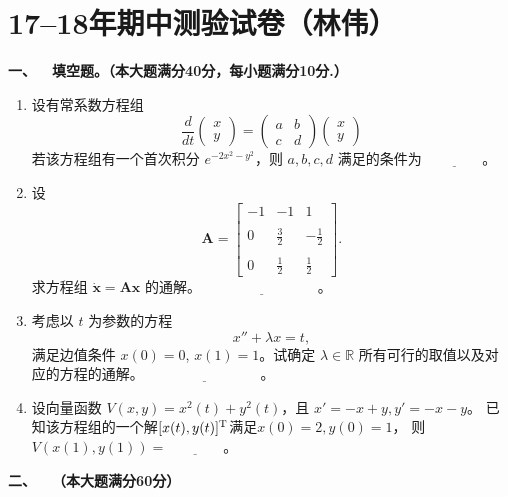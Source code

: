 \section{17--18年期中测验试卷（林伟）}

\textbf{一、\ \ 填空题。（本大题满分40分，每小题满分10分.）}
\begin{enumerate}
\item[1.] 设有常系数方程组 
\[
\frac{d}{dt}\begin{pmatrix} x \\ y \end{pmatrix} = 
\begin{pmatrix}
a & b \\
c & d
\end{pmatrix}
\begin{pmatrix} x \\ y \end{pmatrix}
\]
若该方程组有一个首次积分 $e^{-2x^2-y^2}$，则 $a,b,c,d$ 满足的条件为
$\underline{\qquad\qquad}$。

\item[2.]
设 
\[
\boldsymbol{A} = \begin{bmatrix} 
-1 & -1 & 1 \\ \\
0 & \frac{3}{2} & -\frac{1}{2} \\ \\
0 & \frac{1}{2} & \frac{1}{2} 
\end{bmatrix}.
\]
求方程组 $\dot{\boldsymbol{x}} = \boldsymbol{Ax}$ 的通解。
$\underline{\qquad\qquad\qquad\qquad}$。


\item[3.]
考虑以 $t$ 为参数的方程 
\[
x'' + \lambda x = t,
\]
满足边值条件 $x(0) = 0$, $x(1) = 1$。试确定 $\lambda \in \mathbb{R}$ 所有可行的取值以及对应的方程的通解。
$\underline{\qquad\qquad\qquad\qquad}$。


\item[4.]
设向量函数 $V(x,y) = x^2(t) + y^2(t)$，且 $x'=-x+y,y'=-x-y$。
已知该方程组的一个解$[x(t),y(t)]^{\rm T}$满足$x(0) = 2,y(0) = 1$，
则$V(x(1),y(1))=\underline{\qquad\qquad}$。
\end{enumerate}
\textbf{二、\ \ （本大题满分60分）}
